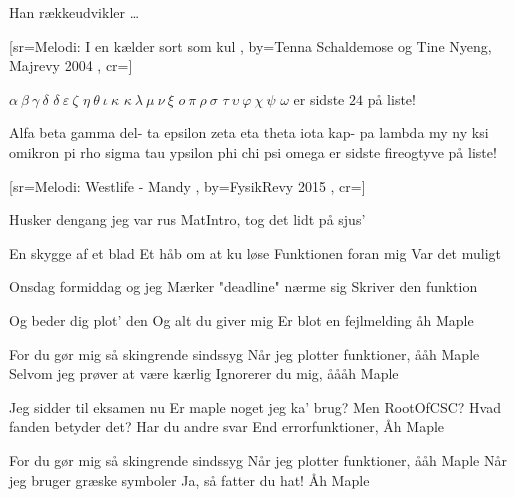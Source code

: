 \documentclass[pdftex,12pt]{article}
\begin{document}
\begin{songs}{}
\beginverse
Han rækkeudvikler \ldots
\endverse
\endsong



﻿[sr={Melodi: I en kælder sort som kul}
,
by={Tenna Schaldemose og Tine Nyeng, Majrevy 2004}
,
cr={}]\hypertarget{$alphabeta$-sangen}{}
\label{song66}

\beginverse
$\alpha\ \beta\ \gamma\ \delta$\hspace{-2.5pt}\protect\colorbox{white}{\phantom{$\delta$}}
\hspace{-2.5pt}$\delta$\hspace{-1.25em}\colorbox{white}{\phantom{$\delta$}}$\ \varepsilon\ \zeta$
$\eta\ \theta\ \iota\ \kappa$\hspace{-2.5pt}\protect\colorbox{white}{\phantom{$\kappa$}}
\hspace{-3pt}$\kappa$\hspace{-1.3em}\colorbox{white}{\phantom{$\kappa$}}$\ \lambda\ \mu\ \nu\ \xi$
$o\ \pi\ \rho\ \sigma$
$\tau\ \upsilon\ \varphi\ \chi\ \psi$
$\omega$ er sidste
$24$ på liste!
\endverse

\beginverse
Alfa beta gamma del-
ta epsilon zeta
eta theta iota kap-
pa lambda my ny ksi
omikron pi rho sigma
tau ypsilon phi chi psi
omega er sidste
fireogtyve på liste!
\endverse
\endsong



[sr={Melodi: Westlife - Mandy}
,
by={FysikRevy 2015}
,
cr={}]\hypertarget{Åh, Maple}{}
\label{song67}

\beginverse
Husker dengang jeg var rus
MatIntro, tog det lidt på sjus'

\endverse
\beginverse
En skygge af et blad
Et håb om at ku løse
Funktionen foran mig
Var det muligt

\endverse
\beginverse
Onsdag formiddag og jeg
Mærker "deadline" nærme sig
Skriver den funktion

\endverse
\beginverse
Og beder dig plot' den
Og alt du giver mig
Er blot en fejlmelding åh Maple

\endverse
\beginverse
For du gør mig så skingrende sindssyg
Når jeg plotter funktioner, ååh Maple
Selvom jeg prøver at være kærlig
Ignorerer du mig, åååh Maple

\endverse
\beginverse
Jeg sidder til eksamen nu
Er maple noget jeg ka' brug?
Men RootOfCSC?
Hvad fanden betyder det?
Har du andre svar
End errorfunktioner, Åh Maple

\endverse
\beginverse
For du gør mig så skingrende sindssyg
Når jeg plotter funktioner, ååh Maple
Når jeg bruger græske symboler
Ja, så fatter du hat! Åh Maple


\end{songs}
\end{document}
